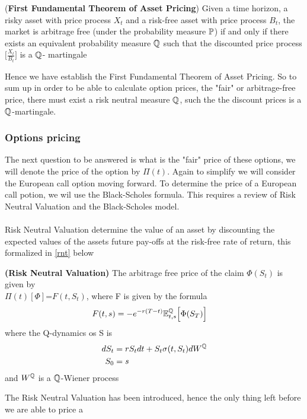 \begin{theorem}
    (\textbf{First Fundamental Theorem of Asset Pricing})
    Given a time horizon, a risky asset with price process $X_t$ and a
    risk-free asset with price process $B_t$, the market is arbitrage free 
    (under the probability measure $\mathbb{P}$) if and only if there exists an 
    equivalent probability measure $\mathbb{Q}$ such that the discounted price process
    $\Big[\frac{X_t}{B_t}\Big]$  is a $\mathbb{Q}$- martingale \cite{Bjork}
    \label{frist_theorem_of_asset_pricing}
\end{theorem}
\noindent 
Hence we have establish the First Fundamental Theorem of Asset Pricing. So to sum up in order to be able to calculate
option prices, the "fair" or arbitrage-free price, there must exist a risk neutral measure $\mathbb{Q}$, such the the discount prices
is a $\mathbb{Q}$-martingale. 
\subsubsection{Options pricing}
The next question to be answered is what is the "fair" price of these options, we will denote the price of
the option by $\Pi(t)$. Again to simplify we will consider
the European call option moving forward. To determine the price of a European call potion, we wil use the 
Black-Scholes formula. This requires a review of Risk Neutral Valuation and the Black-Scholes model.
\\\\
Risk Neutral Valuation determine the value of an asset by discounting the expected values of the assets future 
pay-offs at the risk-free rate of return, this formalized in \autoref{rnt} below
\begin{theorem}
    \textbf{(Risk Neutral Valuation)} The arbitrage free price of the claim $\Phi(S_t)$ is given by \\
    $\Pi(t)[\Phi]$=$F(t,S_t)$, where F is given by the formula 
    \begin{align*}
        F(t,s) &= -e^{-r(T-t)} \mathbb{E}_{t,s}^{\mathbb{Q}} \Big[\Phi(S_T)\Big]
    \end{align*}
    where the Q-dynamics os S is
    \begin{align*}
        dS_t & = r S_t dt + S_t \sigma(t,S_t) dW^{\mathbb{Q}} \\
        S_0 & = s
    \end{align*}
    and $W^{\mathbb{Q}}$ is a $\mathbb{Q}$-Wiener process \cite{Bjork}
    \label{rnt}
\end{theorem}
\noindent 
The Risk Neutral Valuation has been introduced, hence the only thing left before we are able to price a 
